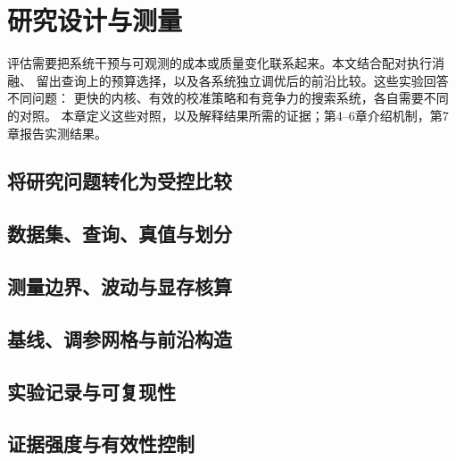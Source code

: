 \chapter{研究设计与测量}
\label{ch:methodology}
评估需要把系统干预与可观测的成本或质量变化联系起来。本文结合配对执行消融、
留出查询上的预算选择，以及各系统独立调优后的前沿比较。这些实验回答不同问题：
更快的内核、有效的校准策略和有竞争力的搜索系统，各自需要不同的对照。
本章定义这些对照，以及解释结果所需的证据；第4--6章介绍机制，第7章报告实测结果。

\section{将研究问题转化为受控比较}
\label{sec:3-1}

\section{数据集、查询、真值与划分}
\label{sec:3-2}

\section{测量边界、波动与显存核算}
\label{sec:3-3}

\section{基线、调参网格与前沿构造}
\label{sec:3-4}

\section{实验记录与可复现性}
\label{sec:3-5}

\section{证据强度与有效性控制}
\label{sec:3-6}

